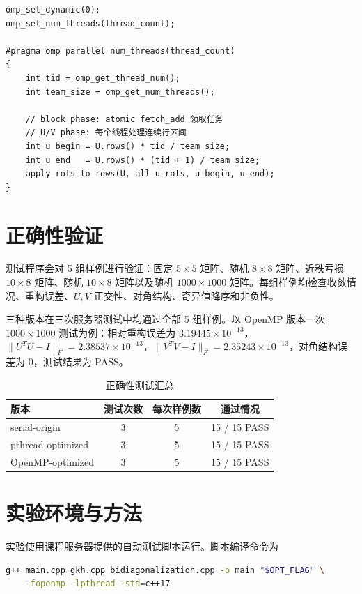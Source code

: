 ﻿\documentclass[UTF8,a4paper]{ctexart}
\begin{document}
\begin{lstlisting}[caption={OpenMP 版本中的手动任务分发和行划分}]
omp_set_dynamic(0);
omp_set_num_threads(thread_count);

#pragma omp parallel num_threads(thread_count)
{
    int tid = omp_get_thread_num();
    int team_size = omp_get_num_threads();

    // block phase: atomic fetch_add 领取任务
    // U/V phase: 每个线程处理连续行区间
    int u_begin = U.rows() * tid / team_size;
    int u_end   = U.rows() * (tid + 1) / team_size;
    apply_rots_to_rows(U, all_u_rots, u_begin, u_end);
}
\end{lstlisting}

\section{正确性验证}

测试程序会对 5 组样例进行验证：固定 $5\times5$ 矩阵、随机 $8\times8$ 矩阵、近秩亏损 $10\times8$ 矩阵、随机 $10\times8$ 矩阵以及随机 $1000\times1000$ 矩阵。每组样例均检查收敛情况、重构误差、$U,V$ 正交性、对角结构、奇异值降序和非负性。

三种版本在三次服务器测试中均通过全部 5 组样例。以 OpenMP 版本一次 $1000\times1000$ 测试为例：相对重构误差为 $3.19445\times 10^{-13}$，$\|U^TU-I\|_F=2.38537\times 10^{-13}$，$\|V^TV-I\|_F=2.35243\times 10^{-13}$，对角结构误差为 0，测试结果为 PASS。

\begin{table}[H]
\centering
\caption{正确性测试汇总}
\begin{tabular}{lccc}
\toprule
版本 & 测试次数 & 每次样例数 & 通过情况 \\
\midrule
serial-origin & 3 & 5 & 15 / 15 PASS \\
pthread-optimized & 3 & 5 & 15 / 15 PASS \\
OpenMP-optimized & 3 & 5 & 15 / 15 PASS \\
\bottomrule
\end{tabular}
\end{table}

\section{实验环境与方法}

实验使用课程服务器提供的自动测试脚本运行。脚本编译命令为

\begin{lstlisting}[language=bash,caption={测试脚本中的编译命令}]
g++ main.cpp gkh.cpp bidiagonalization.cpp -o main "$OPT_FLAG" \
    -fopenmp -lpthread -std=c++17
\end{lstlisting}
\end{document}
